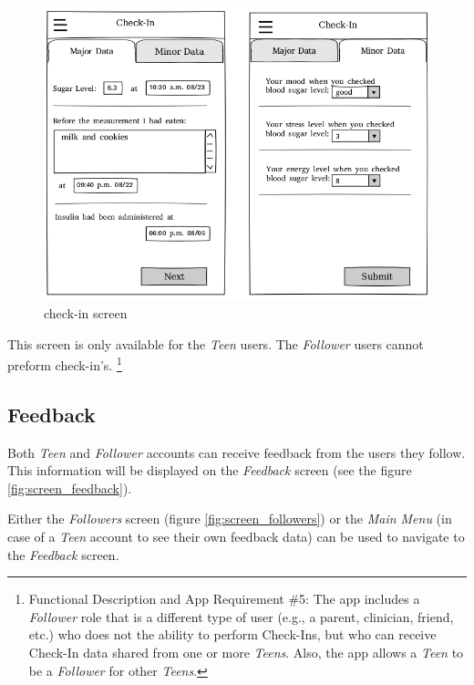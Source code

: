 \documentclass{article}
\begin{document}
    \begin{figure}[h]
        \centering
        \includegraphics[width=\textwidth,height=\textheight,keepaspectratio]{checkin.png}
        \caption{check-in screen}
        \label{fig:screen_checkin}
    \end{figure}

    This screen is only available for the \emph{Teen} users. The \emph{Follower} users cannot preform check-in's.
    \footnote{Functional Description and App Requirement \#5: The app includes a \emph{Follower} role that is a different type of user (e.g., a parent, clinician, friend, etc.) who does not the ability to perform Check-Ins, but who can receive Check-In data shared from one or more \emph{Teens}. Also, the app allows a \emph{Teen} to be a \emph{Follower} for other \emph{Teens}.}

\newpage

    \subsection{Feedback}

    Both \emph{Teen} and \emph{Follower} accounts can receive feedback from the users they follow. This information will be displayed on the \emph{Feedback} screen (see the figure \ref{fig:screen_feedback}).
    
    Either the \emph{Followers} screen (figure \ref{fig:screen_followers}) or the \emph{Main Menu} (in case of a \emph{Teen} account to see their own feedback data) can be used to navigate to the \emph{Feedback} screen. 
\end{document}
